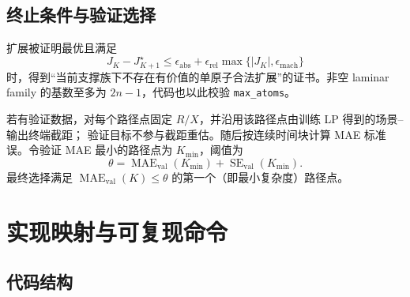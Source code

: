 \documentclass[UTF8,11pt]{ctexart}
\newcommand{\absval}[1]{\left\lvert #1\right\rvert}
\begin{document}
\subsection{终止条件与验证选择}

扩展被证明最优且满足
\begin{equation}
 J_K-J_{K+1}^{\star}
 \le \epsilon_{\mathrm{abs}}
 +\epsilon_{\mathrm{rel}}\max\{\absval{J_K},\epsilon_{\mathrm{mach}}\}
 \label{eq:gain-stop}
\end{equation}
时，得到“当前支撑族下不存在有价值的单原子合法扩展”的证书。非空 laminar family 的基数至多为
$2n-1$，代码也以此校验 \texttt{max\_atoms}。

若有验证数据，对每个路径点固定 $R/X$，并沿用该路径点由训练 LP 得到的场景--输出终端截距；
验证目标不参与截距重估。随后按连续时间块计算 MAE 标准误。令验证 MAE 最小的路径点为
$K_{\min}$，阈值为
\begin{equation}
 \theta=\operatorname{MAE}_{\mathrm{val}}(K_{\min})
 +\operatorname{SE}_{\mathrm{val}}(K_{\min}).
\end{equation}
最终选择满足 $\operatorname{MAE}_{\mathrm{val}}(K)\le\theta$ 的第一个（即最小复杂度）路径点。

\section{实现映射与可复现命令}

\subsection{代码结构}
\end{document}
